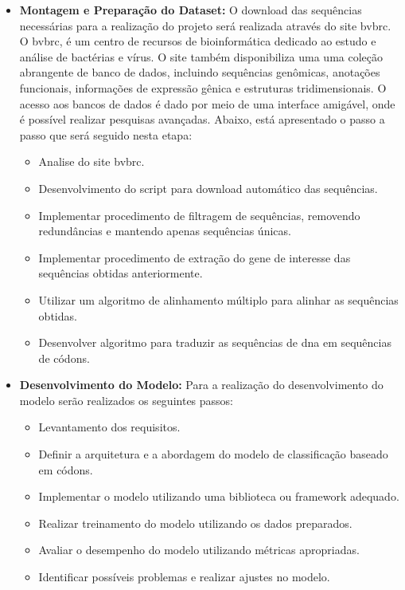 \begin{itemize}
  \item \textbf{Montagem e Preparação do Dataset:} O download das sequências necessárias para a realização do projeto será realizada através do site \gls{bvbrc}. O \gls{bvbrc}, é um centro de recursos de bioinformática dedicado ao estudo e análise de bactérias e vírus. O site também disponibiliza uma uma coleção abrangente de banco de dados, incluindo sequências genômicas, anotações funcionais, informações de expressão gênica e estruturas tridimensionais. O acesso aos bancos de dados é dado por meio de uma interface amigável, onde é possível realizar pesquisas avançadas.
        Abaixo, está apresentado o passo a passo que será seguido nesta etapa:
        \begin{itemize}
          \item Analise do site \gls{bvbrc}.
          \item Desenvolvimento do script para download automático das sequências.
          \item Implementar procedimento de filtragem de sequências, removendo redundâncias e mantendo apenas sequências únicas.
          \item Implementar procedimento de extração do gene de interesse das sequências obtidas anteriormente.
          \item Utilizar um algoritmo de alinhamento múltiplo para alinhar as sequências obtidas.
          \item Desenvolver algoritmo para traduzir as sequências de \gls{dna} em sequências de códons.
        \end{itemize}

  \item \textbf{Desenvolvimento do Modelo:} Para a realização do desenvolvimento do modelo serão realizados os seguintes passos:
        \begin{itemize}
          \item Levantamento dos requisitos.
          \item Definir a arquitetura e a abordagem do modelo de classificação baseado em códons.
          \item Implementar o modelo utilizando uma biblioteca ou framework adequado.
          \item Realizar treinamento do modelo utilizando os dados preparados.
          \item Avaliar o desempenho do modelo utilizando métricas apropriadas.
          \item Identificar possíveis problemas e realizar ajustes no modelo.
        \end{itemize}


\end{itemize}
